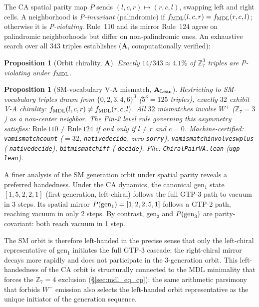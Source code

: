 \documentclass[11pt]{article}
\newtheorem{proposition}[theorem]{Proposition}
\theoremstyle{remark}
\newcommand{\lean}[1]{%
  \penalty-100
  \begingroup\def\_{\textunderscore\allowbreak}\texttt{#1}\endgroup}
\newcommand{\CatA}{\textbf{A}}
\newcommand{\CatAL}{\ensuremath{\textbf{A}_{\rm Lean}}}
\begin{document}
The CA spatial parity map $P$ sends $(l, c, r) \mapsto (r, c, l)$, swapping left and
right cells.
A neighborhood is \emph{P-invariant} (palindromic) if $f_{\rm MDL}(l,c,r) = f_{\rm MDL}(r,c,l)$;
otherwise it is \emph{P-violating}.
Rule~110 and its mirror Rule~124 agree on palindromic neighborhoods but differ on
non-palindromic ones.
An exhaustive search over all $343$ triples establishes ($\CatA$, computationally verified):

\begin{proposition}[Orbit chirality, $\CatA$]\label{prop:chirality}
Exactly $14/343 \approx 4.1\%$ of $\mathbb{Z}_7^3$ triples are P-violating under $f_{\rm MDL}$.
\end{proposition}

\begin{proposition}[SM-vocabulary V-A mismatch, $\CatAL$]\label{prop:va_mismatch}
Restricting to SM-vocabulary triples drawn from $\{0,2,3,4,6\}^3$ ($5^3 = 125$ triples),
exactly $32$ exhibit V-A chirality: $f_{\rm MDL}(l,c,r) \neq f_{\rm MDL}(r,c,l)$.
All $32$ mismatches involve $W^+$ ($\mathbb{Z}_7 = 3$) as a non-center neighbor.
The Fin-2 level rule governing this asymmetry satisfies:
$\mathrm{Rule}\,110 \neq \mathrm{Rule}\,124$ if and only if $l \neq r$ and $c = 0$.
Machine-certified: \lean{va\_mismatch\_count} ($= 32$, \lean{native\_decide},
zero \texttt{sorry}), \lean{va\_mismatch\_involves\_wplus} (\lean{native\_decide}),
\lean{bit\_mismatch\_iff} (\lean{decide}).
File: \texttt{ChiralPairVA.lean} (\texttt{ugp-lean}).
\end{proposition}

A finer analysis of the SM generation orbit under spatial parity reveals a preferred
handedness.
Under the CA dynamics, the canonical gen$_1$ state $[1,5,2,2,1]$ (first-generation,
left-chiral) follows the full GTP-3 path to vacuum in 3 steps.
Its spatial mirror $P({\rm gen}_1) = [1,2,2,5,1]$ follows a GTP-2 path, reaching vacuum
in only 2 steps.
By contrast, gen$_3$ and $P({\rm gen}_3)$ are parity-covariant: both reach vacuum in 1 step.

The SM orbit is therefore left-handed in the precise sense that only the left-chiral
representative of gen$_1$ initiates the full GTP-3 cascade; the right-chiral mirror
decays more rapidly and does not participate in the 3-generation orbit.
This left-handedness of the CA orbit is structurally connected to the MDL minimality that
forces the $\mathbb{Z}_7 = 4$ exclusion (\S\ref{sec:mdl_eq_cp}): the same arithmetic
parsimony that forbids $W^-$ emission also selects the left-handed orbit representative
as the unique initiator of the generation sequence.
\end{document}
